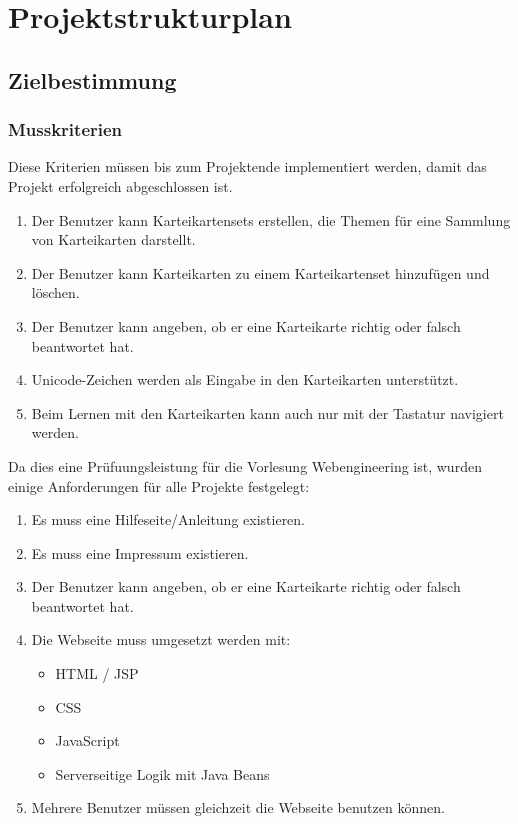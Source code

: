 \section{Projektstrukturplan}

\subsection{Zielbestimmung}
\subsubsection{Musskriterien}
Diese Kriterien müssen bis zum Projektende implementiert werden, damit das Projekt erfolgreich abgeschlossen ist.

\begin{enumerate}[leftmargin=2cm, label=\bfseries /MK\arabic*0/, series=mk]
	\item Der Benutzer kann Karteikartensets erstellen, die Themen für eine Sammlung von Karteikarten darstellt.
	\item Der Benutzer kann Karteikarten zu einem Karteikartenset hinzufügen und löschen.
	\item Der Benutzer kann angeben, ob er eine Karteikarte richtig oder falsch beantwortet hat.
	\item\label{unicode} Unicode-Zeichen werden als Eingabe in den Karteikarten unterstützt.
	\item\label{keyboard} Beim Lernen mit den Karteikarten kann auch nur mit der Tastatur navigiert werden.
\end{enumerate}

\noindent Da dies eine Prüfuungsleistung für die Vorlesung Webengineering ist, wurden einige Anforderungen für alle Projekte festgelegt:
\begin{enumerate}[resume*=mk]
	\item Es muss eine Hilfeseite/Anleitung existieren.
	\item Es muss eine Impressum existieren.
	\item Der Benutzer kann angeben, ob er eine Karteikarte richtig oder falsch beantwortet hat.
	\item Die Webseite muss umgesetzt werden mit:
	\begin{itemize}
		\item HTML / JSP
		\item CSS
		\item JavaScript
		\item Serverseitige Logik mit Java Beans
	\end{itemize}
	\item Mehrere Benutzer müssen gleichzeit die Webseite benutzen können.
\end{enumerate}



